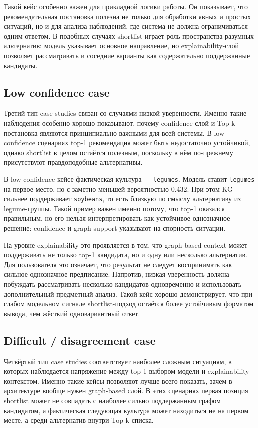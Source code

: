 Такой кейс особенно важен для прикладной логики работы. Он показывает, что рекомендательная постановка полезна не только
для обработки явных и простых ситуаций, но и для анализа наблюдений, где система не должна ограничиваться одним ответом.
В подобных случаях shortlist играет роль пространства разумных альтернатив: модель указывает основное направление, но
explainability-слой позволяет рассматривать и соседние варианты как содержательно поддержанные кандидаты.

\subsection{Low confidence case}

Третий тип case studies связан со случаями низкой уверенности. Именно такие наблюдения особенно хорошо показывают,
почему confidence-слой и Top-k постановка являются принципиально важными для всей системы. В low-confidence сценариях
top-1 рекомендация может быть недостаточно устойчивой, однако shortlist в целом остаётся полезным, поскольку в нём
по-прежнему присутствуют правдоподобные альтернативы.

В low-confidence кейсе фактическая культура --- \texttt{legumes}. Модель ставит \texttt{legumes} на первое место, но с
заметно меньшей вероятностью 0.432. При этом KG сильнее поддерживает \texttt{soybeans}, то есть близкую по смыслу
альтернативу из legume-группы. Такой пример важен именно потому, что top-1 оказался правильным, но его нельзя
интерпретировать как устойчивое однозначное решение: confidence и graph support указывают на спорность ситуации.

На уровне explainability это проявляется в том, что graph-based context может поддерживать не только top-1 кандидата, но
и одну или несколько альтернатив. Для пользователя это означает, что результат не следует воспринимать как сильное
однозначное предписание. Напротив, низкая уверенность должна побуждать рассматривать несколько кандидатов одновременно и
использовать дополнительный предметный анализ. Такой кейс хорошо демонстрирует, что при слабом модельном сигнале
shortlist-подход остаётся более устойчивым форматом вывода, чем жёсткий одновариантный ответ.

\subsection{Difficult / disagreement case}

Четвёртый тип case studies соответствует наиболее сложным ситуациям, в которых наблюдается напряжение между top-1
выбором модели и explainability-контекстом. Именно такие кейсы позволяют лучше всего показать, зачем в архитектуре
вообще нужен graph-based слой. В этих сценариях первая позиция shortlist может не совпадать с наиболее сильно
поддержанным графом кандидатом, а фактическая следующая культура может находиться не на первом месте, а среди
альтернатив внутри Top-k списка.

